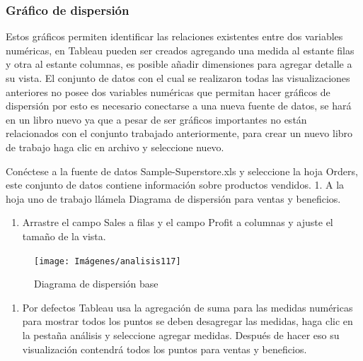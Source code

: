 \documentclass[
]{book}
\providecommand{\tightlist}{%
  \setlength{\itemsep}{0pt}\setlength{\parskip}{0pt}}
\begin{document}
\hypertarget{dispersion}{%
\subsubsection{Gráfico de dispersión}\label{dispersion}}

Estos gráficos permiten identificar las relaciones existentes entre dos variables numéricas, en Tableau pueden ser creados agregando una medida al estante filas y otra al estante columnas, es posible añadir dimensiones para agregar detalle a su vista. El conjunto de datos con el cual se realizaron todas las visualizaciones anteriores no posee dos variables numéricas que permitan hacer gráficos de dispersión por esto es necesario conectarse a una nueva fuente de datos, se hará en un libro nuevo ya que a pesar de ser gráficos importantes no están relacionados con el conjunto trabajado anteriormente, para crear un nuevo libro de trabajo haga clic en archivo y seleccione nuevo.

Conéctese a la fuente de datos Sample-Superstore.xls y seleccione la hoja Orders, este conjunto de datos contiene información sobre productos vendidos.
1. A la hoja uno de trabajo llámela Diagrama de dispersión para ventas y beneficios.

\begin{enumerate}
\def\labelenumi{\arabic{enumi}.}
\setcounter{enumi}{1}
\tightlist
\item
  Arrastre el campo Sales a filas y el campo Profit a columnas y ajuste el tamaño de la vista.
\end{enumerate}

\begin{figure}

{\centering \texttt{[image: Imágenes/analisis117]} 

}

\caption{Diagrama de dispersión base}\label{fig:paso2dispersion-fig}
\end{figure}

\begin{enumerate}
\def\labelenumi{\arabic{enumi}.}
\setcounter{enumi}{2}
\tightlist
\item
  Por defectos Tableau usa la agregación de suma para las medidas numéricas para mostrar todos los puntos se deben desagregar las medidas, haga clic en la pestaña análisis y seleccione agregar medidas. Después de hacer eso su visualización contendrá todos los puntos para ventas y beneficios.
\end{enumerate}
\end{document}
